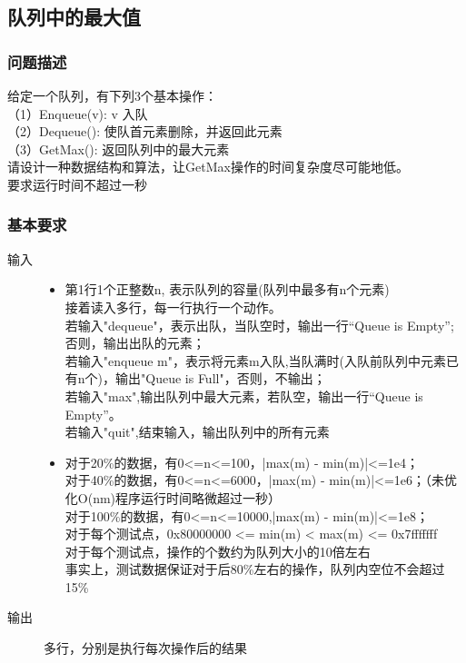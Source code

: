 \documentclass[12pt]{article}
\begin{document}
\subsection{队列中的最大值}
\subsubsection{问题描述}
{\songti 
给定一个队列，有下列3个基本操作：\\
（1）Enqueue(v): v 入队\\
（2）Dequeue(): 使队首元素删除，并返回此元素\\
（3）GetMax(): 返回队列中的最大元素\\
请设计一种数据结构和算法，让GetMax操作的时间复杂度尽可能地低。\\
要求运行时间不超过一秒}
\subsubsection{基本要求}
\begin{description}
    \item[输入] 
    \begin{itemize}
        \item 第1行1个正整数n, 表示队列的容量(队列中最多有n个元素)\\
接着读入多行，每一行执行一个动作。\\
若输入"dequeue"，表示出队，当队空时，输出一行“Queue is Empty”;否则，输出出队的元素；\\
若输入"enqueue m"，表示将元素m入队,当队满时(入队前队列中元素已有n个)，输出"Queue is Full"，否则，不输出；\\
若输入"max",输出队列中最大元素，若队空，输出一行“Queue is Empty”。\\
若输入"quit",结束输入，输出队列中的所有元素\\
        \item 对于20\%的数据，有0<=n<=100，|max(m) - min(m)|<=1e4；\\
对于40\%的数据，有0<=n<=6000，|max(m) - min(m)|<=1e6；（未优化O(nm)程序运行时间略微超过一秒）\\
对于100\%的数据，有0<=n<=10000,|max(m) - min(m)|<=1e8；\\
对于每个测试点，0x80000000 <= min(m) < max(m) <= 0x7fffffff\\
对于每个测试点，操作的个数约为队列大小的10倍左右\\
事实上，测试数据保证对于后80\%左右的操作，队列内空位不会超过15\% \\
    \end{itemize}
    \item[输出] 多行，分别是执行每次操作后的结果
\end{description}
\end{document}
